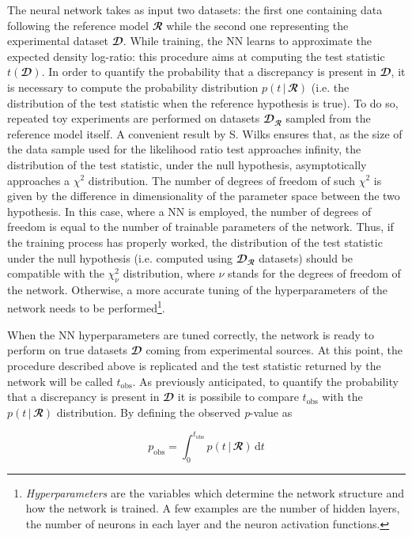 The neural network takes as input two datasets: the first one containing data following the reference model
$\mathbfcal{R}$ while the second one representing the experimental dataset $\mathbfcal{D}$. While training, the NN
learns to approximate the expected density log-ratio: this procedure aims at computing the test statistic
$t(\mathbfcal{D})$. In order to quantify the probability that a discrepancy is present in $\mathbfcal{D}$, it is
necessary to compute the probability distribution $p(t\,|\,\mathbfcal{R})$ (i.e. the distribution of the test statistic
when the reference hypothesis is true). To do so, repeated toy experiments are performed on datasets
$\mathbfcal{D}_{\mathbfcal{R}}$ sampled from the reference model itself. A convenient result by S. Wilks \cite{wilks}
ensures that, as the size of the data sample used for the likelihood ratio test approaches infinity, the distribution of
the test statistic, under the null hypothesis, asymptotically approaches a $\chi^2$ distribution. The number of degrees
of freedom of such $\chi^2$ is given by the difference in dimensionality of the parameter space between the two
hypothesis. In this case, where a NN is employed, the number of degrees of freedom is equal to the number of trainable
parameters of the network. Thus, if the training process has properly worked, the distribution of the test statistic
under the null hypothesis (i.e. computed using $\mathbfcal{D}_{\mathbfcal{R}}$ datasets) should be compatible with the
$\chi^2_\nu$ distribution, where $\nu$ stands for the degrees of freedom of the network. Otherwise, a more accurate
tuning of the hyperparameters of the network needs to be performed\footnote{\textit{Hyperparameters} are the variables
which determine the network structure and how the network is trained. A few examples are the number of hidden layers,
the number of neurons in each layer and the neuron activation functions.}.

When the NN hyperparameters are tuned correctly, the network is ready to perform on true datasets $\mathbfcal{D}$ coming
from experimental sources. At this point, the procedure described above is replicated and the test statistic returned by
the network will be called $t_{\text{obs}}$. As previously anticipated, to quantify the probability that a discrepancy
is present in $\mathbfcal{D}$ it is possibile to compare $t_{\text{obs}}$ with the $p(t\,|\,\mathbfcal{R})$
distribution. By defining the observed \textit{p}-value as 

\begin{equation}
    p_{\text{obs}}=\int_0^{t_{\text{obs}}}p(t\,|\,\mathbfcal{R})\,\text{d}t
\end{equation}

